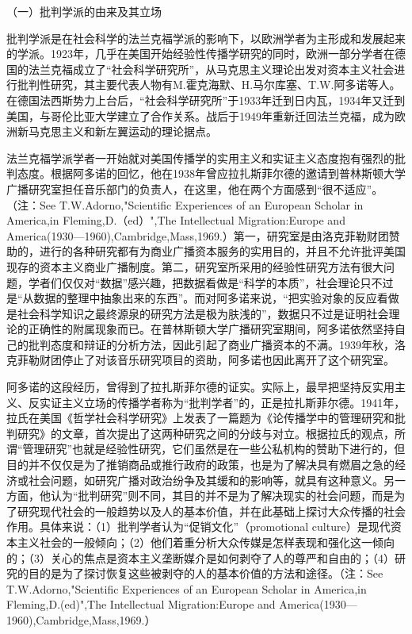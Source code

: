 \documentclass[UTF8,12pt]{ctexart}
\numberwithin{equation}{section} %
\numberwithin{figure}{section}
\numberwithin{table}{section}
\begin{document}
	（一）批判学派的由来及其立场
	
	批判学派是在社会科学的法兰克福学派的影响下，以欧洲学者为主形成和发展起来的学派。1923年，几乎在美国开始经验性传播学研究的同时，欧洲一部分学者在德国的法兰克福成立了“社会科学研究所”，从马克思主义理论出发对资本主义社会进行批判性研究，其主要代表人物有M.霍克海默、H.马尔库塞、T.W.阿多诺等人。在德国法西斯势力上台后，“社会科学研究所”于1933年迁到日内瓦，1934年又迁到美国，与哥伦比亚大学建立了合作关系。战后于1949年重新迁回法兰克福，成为欧洲新马克思主义和新左翼运动的理论据点。
	
	法兰克福学派学者一开始就对美国传播学的实用主义和实证主义态度抱有强烈的批判态度。根据阿多诺的回忆，他在1938年曾应拉扎斯菲尔德的邀请到普林斯顿大学广播研究室担任音乐部门的负责人，在这里，他在两个方面感到“很不适应”。（注：See T.W.Adorno,"Scientific Experiences of an European Scholar in America,in Fleming,D.（ed）",The Intellectual Migration:Europe and America(1930—1960),Cambridge,Mass,1969.）第一，研究室是由洛克菲勒财团赞助的，进行的各种研究都有为商业广播资本服务的实用目的，并且不允许批评美国现存的资本主义商业广播制度。第二，研究室所采用的经验性研究方法有很大问题，学者们仅仅对“数据”感兴趣，把数据看做是“科学的本质”，社会理论只不过是“从数据的整理中抽象出来的东西”。而对阿多诺来说，“把实验对象的反应看做是社会科学知识之最终源泉的研究方法是极为肤浅的”，数据只不过是证明社会理论的正确性的附属现象而已。在普林斯顿大学广播研究室期间，阿多诺依然坚持自己的批判态度和辩证的分析方法，因此引起了商业广播资本的不满。1939年秋，洛克菲勒财团停止了对该音乐研究项目的资助，阿多诺也因此离开了这个研究室。
	
	阿多诺的这段经历，曾得到了拉扎斯菲尔德的证实。实际上，最早把坚持反实用主义、反实证主义立场的传播学者称为“批判学者”的，正是拉扎斯菲尔德。1941年，拉氏在美国《哲学社会科学研究》上发表了一篇题为《论传播学中的管理研究和批判研究》的文章，首次提出了这两种研究之间的分歧与对立。根据拉氏的观点，所谓“管理研究”也就是经验性研究，它们虽然是在一些公私机构的赞助下进行的，但目的并不仅仅是为了推销商品或推行政府的政策，也是为了解决具有燃眉之急的经济或社会问题，如研究广播对政治纷争及其缓和的影响等，就具有这种意义。另一方面，他认为“批判研究”则不同，其目的并不是为了解决现实的社会问题，而是为了研究现代社会的一般趋势以及人的基本价值，并在此基础上探讨大众传播的社会作用。具体来说：（1）批判学者认为“促销文化”（promotional culture）是现代资本主义社会的一般倾向；（2）他们着重分析大众传媒是怎样表现和强化这一倾向的；（3）关心的焦点是资本主义垄断媒介是如何剥夺了人的尊严和自由的；（4）研究的目的是为了探讨恢复这些被剥夺的人的基本价值的方法和途径。（注：See T.W.Adorno,"Scientific Experiences of an European Scholar in America,in Fleming,D.(ed)",The Intellectual Migration:Europe and America(1930—1960),Cambridge,Mass,1969.）
	
\end{document}

